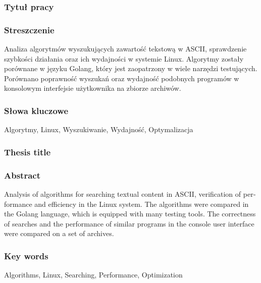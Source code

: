 \subsubsection*{Tytuł pracy} 
\Title

\subsubsection*{Streszczenie}  
Analiza algorytmów wyszukujących zawartość tekstową w ASCII, sprawdzenie 
szybkości działania oraz ich wydajności w systemie Linux. Algorytmy zostały 
porównane w języku Golang, który jest zaopatrzony w wiele narzędzi testujących.
Porównano poprawność wyszukań oraz wydajność podobnych programów w konsolowym
interfejsie użytkownika na zbiorze archiwów.

\subsubsection*{Słowa kluczowe} 
Algorytmy, Linux, Wyszukiwanie, Wydajność, Optymalizacja

\subsubsection*{Thesis title} 
\begin{otherlanguage}{british}
\TitleAlt
\end{otherlanguage}

\subsubsection*{Abstract} 
\begin{otherlanguage}{british}
Analysis of algorithms for searching textual content in ASCII, verification of 
performance and efficiency in the Linux system. The algorithms were compared in
the Golang language, which is equipped with many testing tools. The correctness 
of searches and the performance of similar programs in the console user 
interface were compared on a set of archives.

\end{otherlanguage}
\subsubsection*{Key words}  
\begin{otherlanguage}{british}
Algorithms, Linux, Searching, Performance, Optimization
\end{otherlanguage}


